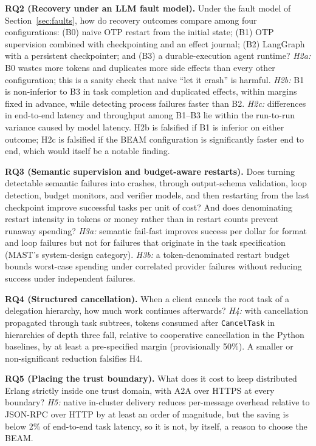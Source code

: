 \documentclass[conference,letterpaper]{IEEEtran}
\newcommand{\code}[1]{\texttt{#1}}
\begin{document}
\textbf{RQ2 (Recovery under an LLM fault model).} Under the fault model of
Section~\ref{sec:faults}, how do recovery outcomes compare among four
configurations: (B0) naive OTP restart from the initial state; (B1) OTP
supervision combined with checkpointing and an effect journal; (B2)
LangGraph with a persistent checkpointer; and (B3) a durable-execution agent
runtime? \emph{H2a:} B0 wastes more tokens and duplicates more side effects
than every other configuration; this is a sanity check that naive ``let it
crash'' is harmful. \emph{H2b:} B1 is non-inferior to B3 in task completion
and duplicated effects, within margins fixed in advance, while detecting
process failures faster than B2. \emph{H2c:} differences in end-to-end
latency and throughput among B1--B3 lie within the run-to-run variance
caused by model latency. H2b is falsified if B1 is inferior on either
outcome; H2c is falsified if the BEAM configuration is significantly faster
end to end, which would itself be a notable finding.

\textbf{RQ3 (Semantic supervision and budget-aware restarts).} Does turning
detectable semantic failures into crashes, through output-schema validation,
loop detection, budget monitors, and verifier models, and then restarting
from the last checkpoint improve successful tasks per unit of cost? And does
denominating restart intensity in tokens or money rather than in restart
counts prevent runaway spending? \emph{H3a:} semantic fail-fast improves
success per dollar for format and loop failures but not for failures that
originate in the task specification (MAST's system-design category).
\emph{H3b:} a token-denominated restart budget bounds worst-case spending
under correlated provider failures without reducing success under
independent failures.

\textbf{RQ4 (Structured cancellation).} When a client cancels the root task
of a delegation hierarchy, how much work continues afterwards? \emph{H4:}
with cancellation propagated through task subtrees, tokens consumed after
\code{CancelTask} in hierarchies of depth three fall, relative to
cooperative cancellation in the Python baselines, by at least a
pre-specified margin (provisionally 50\%). A smaller or non-significant
reduction falsifies H4.

\textbf{RQ5 (Placing the trust boundary).} What does it cost to keep
distributed Erlang strictly inside one trust domain, with A2A over HTTPS at
every boundary? \emph{H5:} native in-cluster delivery reduces per-message
overhead relative to JSON-RPC over HTTP by at least an order of magnitude,
but the saving is below 2\% of end-to-end task latency, so it is not, by
itself, a reason to choose the BEAM.
\end{document}
